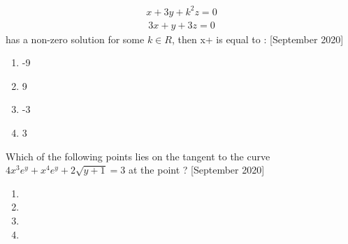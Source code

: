     \begin{align*}
        x+3y+k^2z=0
    \end{align*}
    \begin{align*}
        3x+y+3z=0
    \end{align*}
    has a non-zero solution  for some $k\in R$, then x+ is equal to : \hfill{[September 2020]}
    \begin{enumerate}
    
        \item -9
        \item 9
        \item -3
        \item 3
       \end{enumerate}

 
 \item Which of the following points lies on the tangent to the curve $4x^3e^y+x^4e^y+2\sqrt{y+1}=3$ at the point  ? \hfill{[September 2020]}
 \begin{enumerate}
     \item {}
     \item {}
     \item {}
     \item {}
 \end{enumerate}
